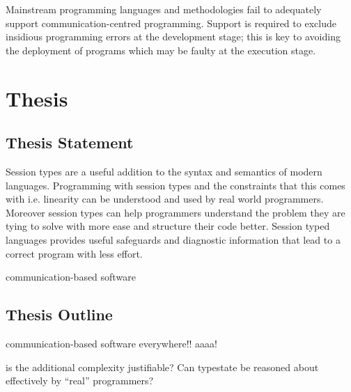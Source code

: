 Mainstream programming languages and methodologies fail to adequately support communication-centred programming. Support is required to exclude insidious programming errors at the development stage; this is key to avoiding the deployment of programs which may be faulty at the execution stage.








\section{Thesis}

\subsection{Thesis Statement}

Session types are a useful addition to the syntax and semantics of modern languages. Programming with session types and the constraints that this comes with i.e. linearity can be understood and used by real world programmers. Moreover session types can help programmers understand the problem they are tying to solve with more ease and structure their code better.
Session typed languages provides useful safeguards and diagnostic information that lead to a correct program with less effort.

communication-based software


\subsection{Thesis Outline}

communication-based software everywhere!! aaaa!



is the additional complexity justifiable? Can typestate be reasoned about effectively by “real” programmers?
